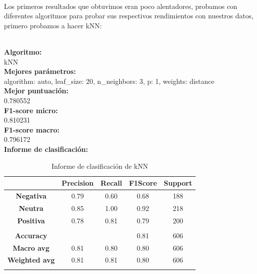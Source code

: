 \documentclass{report}
\begin{document}
{                \paragraph*{}{
                Los primeros resultados que obtuvimos eran poco alentadores, probamos con diferentes algoritmos para probar sus respectivos rendimientos con nuestros datos, primero probamos a hacer kNN:
                }
                     \\
                    \phantom{}
                    \\
                    \begin{center} {
                    \textbf{Algoritmo: }
                    \\
                    kNN
                    \\
                    \textbf{Mejores parámetros: }
                    \\
                    algorithm: auto, leaf\_size: 20, n\_neighbors: 3, p: 1, weights: distance
                    \\
                    \textbf{Mejor puntuación: }
                    \\
                    0.780552
                    \\
                    \textbf{F1-score micro: }
                    \\
                    0.810231
                    \\
                    \textbf{F1-score macro: }
                    \\
                    0.796172
                    \\
                    \textbf{Informe de clasificación: }

                    \begin{longtable}{|c|c|c|c|c|}
                    \hline
                    & \textbf{Precision} & \textbf{Recall} & \textbf{F1Score} & \textbf{Support} \\
                    \hline
                    \textbf{Negativa} & 0.79 & 0.60 & 0.68 & 188 \\
                    \hline
                    \textbf{Neutra} & 0.85 & 1.00 & 0.92 & 218 \\
                    \hline
                    \textbf{Positiva} & 0.78 & 0.81 & 0.79 & 200 \\
                    \hline
                    & \phantom{} & \phantom{} & \phantom{} & \phantom{} \\
                    \hline
                    \textbf{Accuracy} &  &  & 0.81 & 606 \\
                    \hline
                    \textbf{Macro avg} & 0.81 & 0.80 & 0.80 & 606 \\
                    \hline
                    \textbf{Weighted avg} & 0.81 & 0.81 & 0.80 & 606 \\
                    \hline
                    \caption{Informe de clasificación de kNN}
                    \end{longtable}
            
}
\end{center}}
\end{document}
